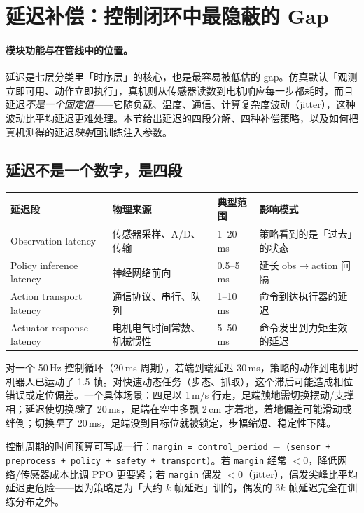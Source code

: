 \section{延迟补偿：控制闭环中最隐蔽的 Gap}
\label{sec:rlmc-s2r-latency}

\paragraph{模块功能与在管线中的位置。}延迟是七层分类里「时序层」的核心，也是最容易被低估的 gap。仿真默认「观测立即可用、动作立即执行」，真机则从传感器读数到电机响应每一步都耗时，而且延迟\emph{不是一个固定值}——它随负载、温度、通信、计算复杂度波动（jitter），这种波动比平均延迟更难处理。本节给出延迟的四段分解、四种补偿策略，以及如何把真机测得的延迟\emph{映射}回训练注入参数。

\subsection{延迟不是一个数字，是四段}
\label{sec:rlmc-s2r-latency-four}

\begin{center}
\small
\begin{tabular}{@{}lp{3.6cm}lp{3.4cm}@{}}
\toprule
延迟段 & 物理来源 & 典型范围 & 影响模式 \\
\midrule
Observation latency & 传感器采样、A/D、传输 & 1--20\,ms & 策略看到的是「过去」的状态 \\
Policy inference latency & 神经网络前向 & 0.5--5\,ms & 延长 obs$\to$action 间隔 \\
Action transport latency & 通信协议、串行、队列 & 1--10\,ms & 命令到达执行器的延迟 \\
Actuator response latency & 电机电气时间常数、机械惯性 & 5--50\,ms & 命令发出到力矩生效的延迟 \\
\bottomrule
\end{tabular}
\end{center}

对一个 50\,Hz 控制循环（20\,ms 周期），若端到端延迟 30\,ms，策略的动作到电机时机器人已运动了 1.5 帧。对快速动态任务（步态、抓取），这个滞后可能造成相位错误或定位偏差。一个具体场景：四足以 1\,m/s 行走，足端触地需切换摆动/支撑相；延迟使切换\emph{晚}了 20\,ms，足端在空中多飘 2\,cm 才着地，着地偏差可能滑动或绊倒；切换\emph{早}了 20\,ms，足端没到目标位就被锁定，步幅缩短、稳定性下降。

控制周期的时间预算可写成一行：\texttt{margin = control\_period $-$ (sensor + preprocess + policy + safety + transport)}。若 \texttt{margin} 经常 $<0$，降低网络/传感器成本比调 PPO 更要紧；若 \texttt{margin} 偶发 $<0$（jitter），偶发尖峰比平均延迟更危险——因为策略是为「大约 $k$ 帧延迟」训的，偶发的 $3k$ 帧延迟完全在训练分布之外。

